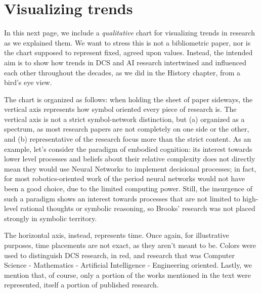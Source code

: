 \documentclass[../main.tex]{subfiles}
\begin{document}
\section{Visualizing trends}
In this next page, we include a \textit{qualitative} chart for visualizing trends in research as we explained them. We want to stress this is not a bibliometric paper, nor is the chart supposed to represent fixed, agreed upon values. Instead, the intended aim is to show how trends in DCS and AI research intertwined and influenced each other throughout the decades, as we did in the History chapter, from a bird's eye view.

The chart is organized as follows: when holding the sheet of paper sideways, the vertical axis represents how symbol oriented every piece of research is. The vertical axis is not a strict symbol-network distinction, but (a) organized as a spectrum, as most research papers are not completely on one side or the other, and (b) representative of the research focus more than the strict content. As an example, let's consider the paradigm of embodied cognition: its interest towards lower level processes and beliefs about their relative complexity does not directly mean they would use Neural Networks to implement decisional processes; in fact, for most robotics-oriented work of the period neural networks would not have been a good choice, due to the limited computing power. Still, the insurgence of such a paradigm shows an interest towards processes that are not limited to high-level rational thoughts or symbolic reasoning, so Brooks' research was not placed strongly in symbolic territory.

The horizontal axis, instead, represents time. Once again, for illustrative purposes, time placements are not exact, as they aren't meant to be. Colors were used to distinguish DCS research, in red, and research that was Computer Science - Mathematics - Artificial Intelligence - Engineering oriented. Lastly, we mention that, of course, only a portion of the works mentioned in the text were represented, itself a portion of published research.

\newpage
\end{document}
